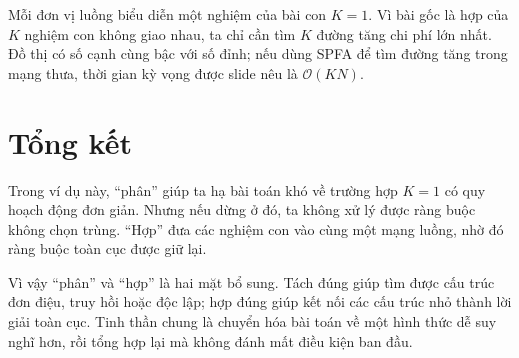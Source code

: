 \documentclass[11pt]{article}
\newcommand{\Oh}{\mathcal{O}}
\begin{document}
Mỗi đơn vị luồng biểu diễn một nghiệm của bài con \(K=1\). Vì bài gốc là hợp
của \(K\) nghiệm con không giao nhau, ta chỉ cần tìm \(K\) đường tăng chi phí
lớn nhất. Đồ thị có số cạnh cùng bậc với số đỉnh; nếu dùng SPFA để tìm đường
tăng trong mạng thưa, thời gian kỳ vọng được slide nêu là \(\Oh(KN)\).

\section{Tổng kết}

Trong ví dụ này, ``phân'' giúp ta hạ bài toán khó về trường hợp \(K=1\) có
quy hoạch động đơn giản. Nhưng nếu dừng ở đó, ta không xử lý được ràng buộc
không chọn trùng. ``Hợp'' đưa các nghiệm con vào cùng một mạng luồng, nhờ đó
ràng buộc toàn cục được giữ lại.

Vì vậy ``phân'' và ``hợp'' là hai mặt bổ sung. Tách đúng giúp tìm được cấu
trúc đơn điệu, truy hồi hoặc độc lập; hợp đúng giúp kết nối các cấu trúc nhỏ
thành lời giải toàn cục. Tinh thần chung là chuyển hóa bài toán về một hình
thức dễ suy nghĩ hơn, rồi tổng hợp lại mà không đánh mất điều kiện ban đầu.
\end{document}

